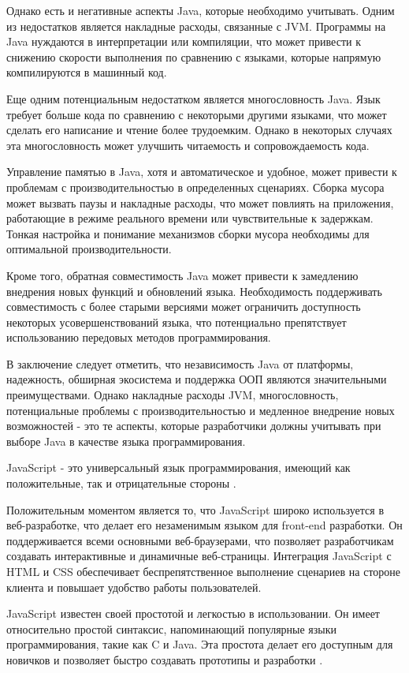 Однако есть и негативные аспекты Java, которые необходимо учитывать. Одним из недостатков является накладные расходы, связанные с JVM. Программы на Java нуждаются в интерпретации или компиляции, что может привести к снижению скорости выполнения по сравнению с языками, которые напрямую компилируются в машинный код.

Еще одним потенциальным недостатком является многословность Java. Язык требует больше кода по сравнению с некоторыми другими языками, что может сделать его написание и чтение более трудоемким. Однако в некоторых случаях эта многословность может улучшить читаемость и сопровождаемость кода.

Управление памятью в Java, хотя и автоматическое и удобное, может привести к проблемам с производительностью в определенных сценариях. Сборка мусора может вызвать паузы и накладные расходы, что может повлиять на приложения, работающие в режиме реального времени или чувствительные к задержкам. Тонкая настройка и понимание механизмов сборки мусора необходимы для оптимальной производительности.

Кроме того, обратная совместимость Java может привести к замедлению внедрения новых функций и обновлений языка. Необходимость поддерживать совместимость с более старыми версиями может ограничить доступность некоторых усовершенствований языка, что потенциально препятствует использованию передовых методов программирования.

В заключение следует отметить, что независимость Java от платформы, надежность, обширная экосистема и поддержка ООП являются значительными преимуществами. Однако накладные расходы JVM, многословность, потенциальные проблемы с производительностью и медленное внедрение новых возможностей - это те аспекты, которые разработчики должны учитывать при выборе Java в качестве языка программирования.

JavaScript - это универсальный язык программирования, имеющий как положительные, так и отрицательные стороны \cite{js1}.

Положительным моментом является то, что JavaScript широко используется в веб-разработке, что делает его незаменимым языком для front-end разработки. Он поддерживается всеми основными веб-браузерами, что позволяет разработчикам создавать интерактивные и динамичные веб-страницы. Интеграция JavaScript с HTML и CSS обеспечивает беспрепятственное выполнение сценариев на стороне клиента и повышает удобство работы пользователей.

JavaScript известен своей простотой и легкостью в использовании. Он имеет относительно простой синтаксис, напоминающий популярные языки программирования, такие как C и Java. Эта простота делает его доступным для новичков и позволяет быстро создавать прототипы и разработки \cite{js2}.

